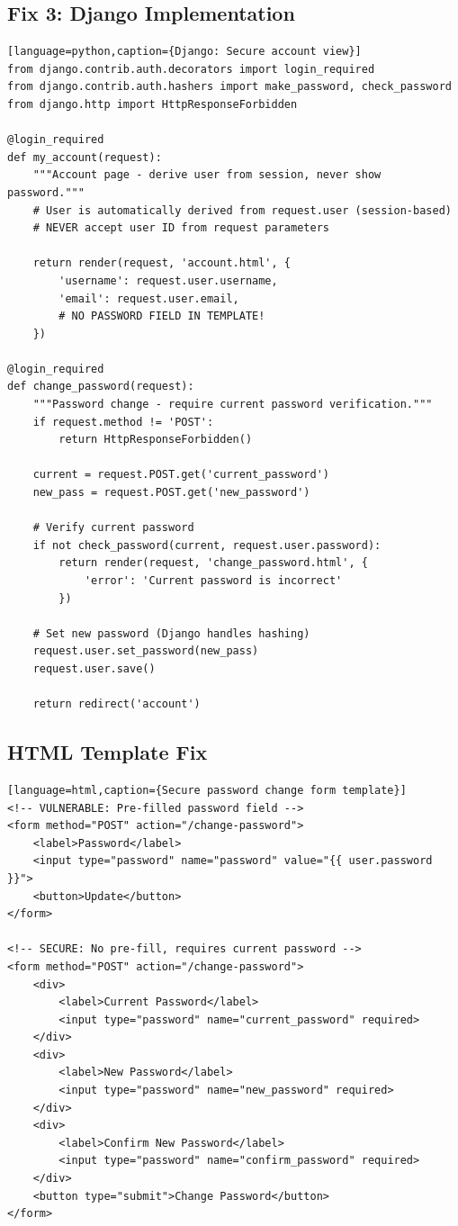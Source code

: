 \documentclass[11pt,letterpaper]{article}
\begin{document}
\subsection{Fix 3: Django Implementation}

\begin{verbatim}[language=python,caption={Django: Secure account view}]
from django.contrib.auth.decorators import login_required
from django.contrib.auth.hashers import make_password, check_password
from django.http import HttpResponseForbidden

@login_required
def my_account(request):
    """Account page - derive user from session, never show password."""
    # User is automatically derived from request.user (session-based)
    # NEVER accept user ID from request parameters

    return render(request, 'account.html', {
        'username': request.user.username,
        'email': request.user.email,
        # NO PASSWORD FIELD IN TEMPLATE!
    })

@login_required
def change_password(request):
    """Password change - require current password verification."""
    if request.method != 'POST':
        return HttpResponseForbidden()

    current = request.POST.get('current_password')
    new_pass = request.POST.get('new_password')

    # Verify current password
    if not check_password(current, request.user.password):
        return render(request, 'change_password.html', {
            'error': 'Current password is incorrect'
        })

    # Set new password (Django handles hashing)
    request.user.set_password(new_pass)
    request.user.save()

    return redirect('account')
\end{verbatim}

\subsection{HTML Template Fix}

\begin{verbatim}[language=html,caption={Secure password change form template}]
<!-- VULNERABLE: Pre-filled password field -->
<form method="POST" action="/change-password">
    <label>Password</label>
    <input type="password" name="password" value="{{ user.password }}">
    <button>Update</button>
</form>

<!-- SECURE: No pre-fill, requires current password -->
<form method="POST" action="/change-password">
    <div>
        <label>Current Password</label>
        <input type="password" name="current_password" required>
    </div>
    <div>
        <label>New Password</label>
        <input type="password" name="new_password" required>
    </div>
    <div>
        <label>Confirm New Password</label>
        <input type="password" name="confirm_password" required>
    </div>
    <button type="submit">Change Password</button>
</form>
\end{verbatim}
\end{document}
